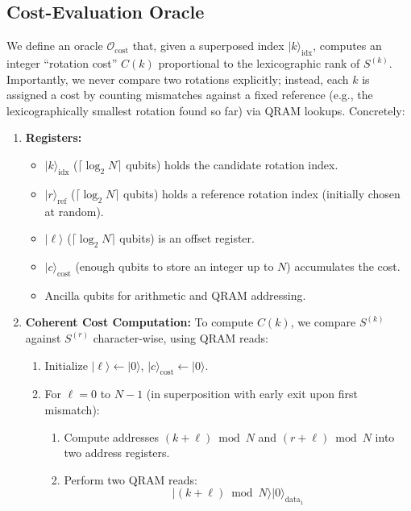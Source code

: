 \documentclass[11pt,letterpaper]{article}
\begin{document}
\subsection{Cost-Evaluation Oracle}
\label{sec:algorithm:oracle}
We define an oracle \(\mathcal{O}_{\mathrm{cost}}\) that, given a superposed index \(\lvert k\rangle_{\text{idx}}\), computes an integer ``rotation cost'' \(C(k)\) proportional to the lexicographic rank of \(S^{(k)}\). Importantly, we never compare two rotations explicitly; instead, each \(k\) is assigned a cost by counting mismatches against a fixed reference (e.g., the lexicographically smallest rotation found so far) via QRAM lookups. Concretely:

\begin{enumerate}
    \item \textbf{Registers:}
    \begin{itemize}
        \item \(\lvert k\rangle_{\text{idx}}\) (\(\lceil\log_{2}N\rceil\) qubits) holds the candidate rotation index.
        \item \(\lvert r\rangle_{\text{ref}}\) (\(\lceil\log_{2}N\rceil\) qubits) holds a reference rotation index (initially chosen at random).
        \item \(\lvert \ell\rangle\) (\(\lceil\log_{2}N\rceil\) qubits) is an offset register.
        \item \(\lvert c\rangle_{\text{cost}}\) (enough qubits to store an integer up to \(N\)) accumulates the cost.
        \item Ancilla qubits for arithmetic and QRAM addressing.
    \end{itemize}
    \item \textbf{Coherent Cost Computation:} To compute \(C(k)\), we compare \(S^{(k)}\) against \(S^{(r)}\) character-wise, using QRAM reads:
    \begin{enumerate}
        \item Initialize \(\lvert \ell\rangle\leftarrow\lvert 0\rangle\), \(\lvert c\rangle_{\text{cost}}\leftarrow\lvert 0\rangle\).
        \item For \(\ell=0\) to \(N-1\) (in superposition with early exit upon first mismatch):
        \begin{enumerate}
            \item Compute addresses \((k+\ell)\bmod N\) and \((r+\ell)\bmod N\) into two address registers.
            \item Perform two QRAM reads:
            \[
              \lvert (k+\ell)\bmod N\rangle \lvert 0\rangle_{\text{data}_1}
\]
\end{enumerate}
\end{enumerate}
\end{enumerate}
\end{document}
